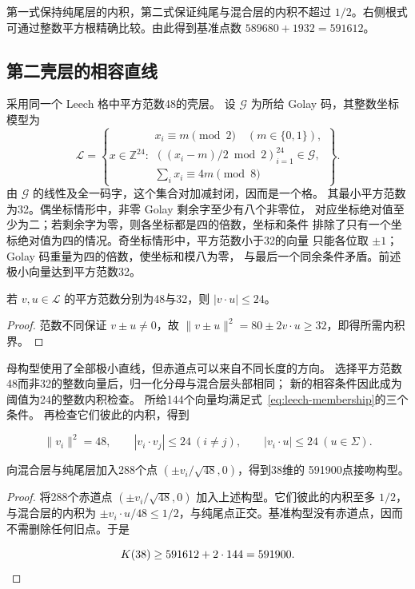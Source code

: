 第一式保持纯尾层的内积，第二式保证纯尾与混合层的内积不超过
\(1/2\)。右侧根式可通过整数平方根精确比较。由此得到基准点数
\(589680+1932=591612\)。

\subsection{第二壳层的相容直线}

采用同一个 Leech 格中平方范数48的壳层。
设 $\mathcal G$ 为所给 Golay 码，其整数坐标模型为
\begin{equation}
\mathcal L=\left\{x\in\mathbb Z^{24}:\begin{array}{l}
x_i\equiv m\pmod2\quad(m\in\{0,1\}),\\
((x_i-m)/2\bmod2)_{i=1}^{24}\in\mathcal G,\\
\sum_i x_i\equiv4m\pmod8
\end{array}\right\}.
\label{eq:leech-membership}
\end{equation}
由 $\mathcal G$ 的线性及全一码字，这个集合对加减封闭，因而是一个格。
其最小平方范数为32。偶坐标情形中，非零 Golay 剩余字至少有八个非零位，
对应坐标绝对值至少为二；若剩余字为零，则各坐标都是四的倍数，坐标和条件
排除了只有一个坐标绝对值为四的情况。奇坐标情形中，平方范数小于32的向量
只能各位取 $\pm1$；Golay 码重量为四的倍数，使坐标和模八为零，
与最后一个同余条件矛盾。前述极小向量达到平方范数32。

\begin{lemma}[第二壳层的相容性]
\label{lem:second-shell}
若 $v,u\in\mathcal L$ 的平方范数分别为48与32，则 $|v\cdot u|\le24$。
\end{lemma}
\begin{proof}
范数不同保证 $v\pm u\ne0$，故
$\|v\pm u\|^2=80\pm2v\cdot u\ge32$，即得所需内积界。
\end{proof}

母构型使用了全部极小直线，但赤道点可以来自不同长度的方向。
选择平方范数48而非32的整数向量后，归一化分母与混合层头部相同；
新的相容条件因此成为阈值为24的整数内积检查。
所给144个向量均满足式~\eqref{eq:leech-membership}的三个条件。
再检查它们彼此的内积，得到

\[
\|v_i\|^2=48,\qquad
|v_i\cdot v_j|\le24\ (i\ne j),\qquad
|v_i\cdot u|\le24\ (u\in\Sigma).
\]

\begin{proposition}[赤道补充]
\label{prop:equatorial}
向混合层与纯尾层加入288个点 $(\pm v_i/\sqrt{48},0)$，得到38维的
591900点接吻构型。
\end{proposition}
\begin{proof}
将288个赤道点 \((\pm v_i/\sqrt{48},0)\) 加入上述构型。它们彼此的内积至多
\(1/2\)，与混合层的内积为
\(\pm v_i\cdot u/48\le1/2\)，与纯尾点正交。基准构型没有赤道点，因而不需删除任何旧点。于是

\[
K(38)\ge591612+2\cdot144=591900.\qedhere
\]
\end{proof}

